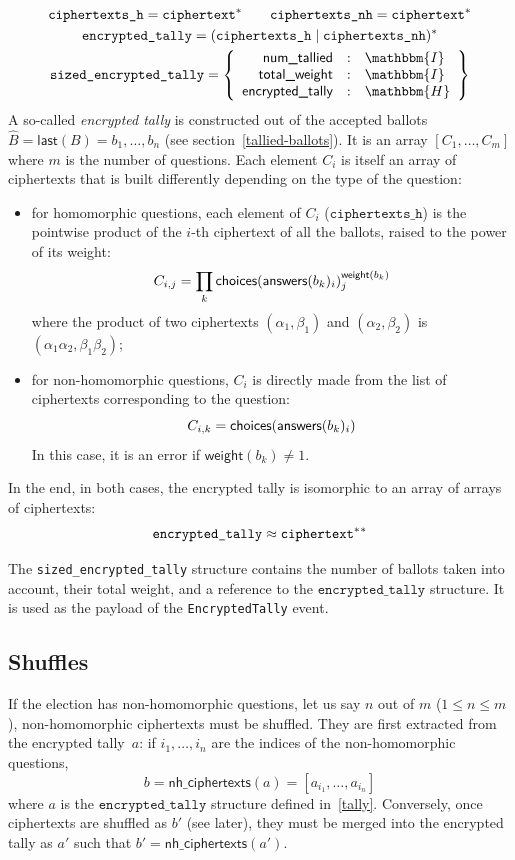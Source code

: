 \documentclass[a4paper]{article}
\newcommand{\hash}{\mathbbm{H}}
\newcommand{\I}{\mathbbm{I}}
\newcommand{\etally}{\texttt{encrypted\_tally}}
\begin{document}
\begin{gather*}
  \texttt{ciphertexts\_h}=\ciphertext^\ast
  \qquad
  \texttt{ciphertexts\_nh}=\ciphertext^\ast
  \\
  \etally=(\texttt{ciphertexts\_h}\mid\texttt{ciphertexts\_nh})^\ast\\
  \texttt{sized\_encrypted\_tally}=\left\{
    \begin{array}{rcl}
      \textsf{num\_tallied}&:&\I\\
      \textsf{total\_weight}&:&\I\\
      \textsf{encrypted\_tally}&:&\hash
    \end{array}
  \right\}
\end{gather*}
A so-called \emph{encrypted tally} is constructed out of the accepted
ballots $\hat B=\textsf{last}(B)=b_1,\dots,b_n$ (see section~\ref{tallied-ballots}).
It is an array $[C_1,\dots,C_m]$ where $m$ is the number of
questions. Each element $C_i$ is itself an array of ciphertexts that
is built differently depending on the type of the question:
\begin{itemize}
\item for homomorphic questions, each element of $C_i$
  ($\texttt{ciphertexts\_h}$) is the pointwise product of the $i$-th
  ciphertext of all the ballots, raised to the power of its weight:
  \[
    C_{i,j}=\prod_{k}\textsf{choices}(\textsf{answers}(b_k)_i)_j^{\textsf{weight}(b_k)}
  \]
  where the product of two ciphertexts $(\alpha_1,\beta_1)$ and
  $(\alpha_2,\beta_2)$ is $(\alpha_1\alpha_2,\beta_1\beta_2)$;
\item for non-homomorphic questions, $C_i$ is directly made from the
  list of ciphertexts corresponding to the question:
  \[
    C_{i,k}=\textsf{choices}(\textsf{answers}(b_k)_i)
  \]
  In this case, it is an error if $\textsf{weight}(b_k)\neq 1$.
\end{itemize}
In the end, in both cases, the encrypted tally is isomorphic to an
array of arrays of ciphertexts:
\[
\etally\approx\ciphertext^\ast{}^\ast
\]

The \texttt{sized\_encrypted\_tally} structure contains the number of
ballots taken into account, their total weight, and a reference to the
$\etally$ structure. It is used as the payload of the
\texttt{EncryptedTally} event.

\subsection{Shuffles}
\label{shuffles}

If the election has non-homomorphic questions, let us say $n$ out of
$m$ ($1\leq n\leq m$), non-homomorphic ciphertexts must be
shuffled. They are first extracted from the encrypted tally~$a$: if
$i_1,\dots,i_n$ are the indices of the non-homomorphic questions,
\[
  b=\textsf{nh\_ciphertexts}(a)=[a_{i_1},\dots,a_{i_n}]
\]
where $a$ is the $\etally$ structure defined
in~\ref{tally}. Conversely, once ciphertexts are shuffled as $b'$ (see
later), they must be merged into the encrypted tally as $a'$ such that
$b'=\textsf{nh\_ciphertexts}(a')$.
\end{document}
